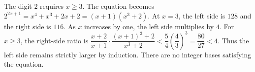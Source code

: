 The digit $2$ requires $x\ge3$. The equation becomes $2^{2x+1}=x^4+x^3+2x+2=(x+1)(x^3+2)$. At $x=3$, the left side is $128$ and the right side is $116$. As $x$ increases by one, the left side multiplies by $4$. For $x\ge3$, the right-side ratio is $\dfrac{x+2}{x+1}\cdot\dfrac{(x+1)^3+2}{x^3+2}<\dfrac{5}{4}\left(\dfrac{4}{3}\right)^3=\dfrac{80}{27}<4$. Thus the left side remains strictly larger by induction. There are no integer bases satisfying the equation.

